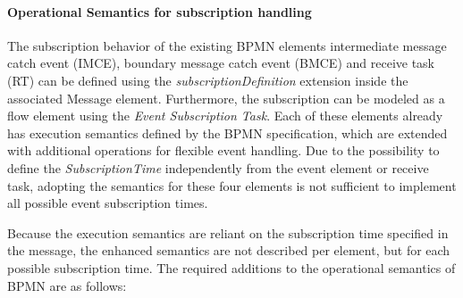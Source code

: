 \paragraph{Operational Semantics for subscription handling}
The subscription behavior of the existing BPMN elements intermediate message catch event (IMCE), boundary message catch event (BMCE) and receive task (RT) can be defined using the \textit{subscriptionDefinition} extension inside the associated Message element.
Furthermore, the subscription can be modeled as a flow element using the \textit{Event Subscription Task}.
Each of these elements already has execution semantics defined by the BPMN specification, which are extended with additional operations for flexible event handling.
Due to the possibility to define the \textit{SubscriptionTime} independently from the event element or receive task, adopting the semantics for these four elements is not sufficient to implement all possible event subscription times.

Because the execution semantics are reliant on the subscription time specified in the message, the enhanced semantics are not described per element, but for each possible subscription time.
The required additions to the operational semantics of BPMN are as follows:

